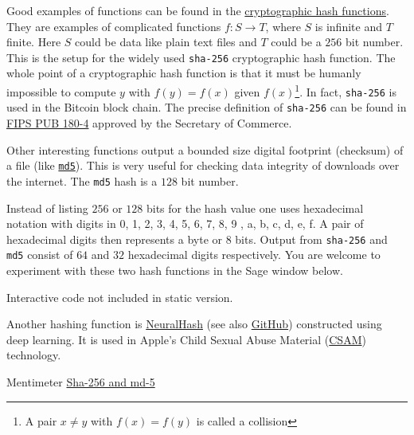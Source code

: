 \begin{example}\label{crypthashex}
  Good examples of functions can be found in the \href{https://en.wikipedia.org/wiki/Cryptographic\_hash\_function}{cryptographic hash functions}. They are examples of complicated functions $f:S \rightarrow T$, where
  $S$ is infinite and $T$ finite. Here $S$ could be data like plain text files and $T$ could be
  a $256$ bit number. This is the setup for the widely used \texttt{sha-256} cryptographic hash function.
  The whole point of a cryptographic hash function is that it must be humanly impossible to
  compute $y$ with $f(y) = f(x)$ given $f(x)$\footnote{A pair $x\neq y$ with $f(x) = f(y)$ is called a collision}.
  In fact, \texttt{sha-256} is used in the Bitcoin block chain. The precise definition of
  \texttt{sha-256} can be found in \href{http://nvlpubs.nist.gov/nistpubs/FIPS/NIST.FIPS.180-4.pdf}{FIPS PUB 180-4} approved by the Secretary of Commerce.

  Other interesting functions output a bounded size digital footprint (checksum) of a file (like \href{https://en.wikipedia.org/wiki/MD5}{\texttt{md5}}). This is very useful
  for checking data integrity of downloads over the internet. The \texttt{md5} hash is a $128$ bit number.

  Instead of listing $256$ or $128$ bits for the hash value one uses hexadecimal notation with digits
  in 0, 1, 2, 3, 4, 5, 6, 7, 8, 9 , a, b, c, d, e, f. A pair of hexadecimal digits then represents
  a byte or $8$ bits. Output from \texttt{sha-256} and \texttt{md5} consist of $64$ and $32$ hexadecimal
  digits respectively. You are welcome to experiment with these two hash functions in the
  Sage window below.

  \begin{sage} Interactive code not included in static version.\end{sage}

  Another hashing function is \href{https://devpost.com/software/neuralhash}{NeuralHash} (see also \href{https://github.com/nikcheerla/neuralhash}{GitHub}) constructed using deep learning. It is used in Apple's Child
  Sexual Abuse Material (\href{https://www.apple.com/child-safety/}{CSAM}) technology.
\end{example}

\begin{button}{Mentimeter}
  \href{https://www.mentimeter.com/s/dba24544cfd2c82ec5bccb7429b46895/a31d86b8863c}{Sha-256 and md-5}
\end{button}

